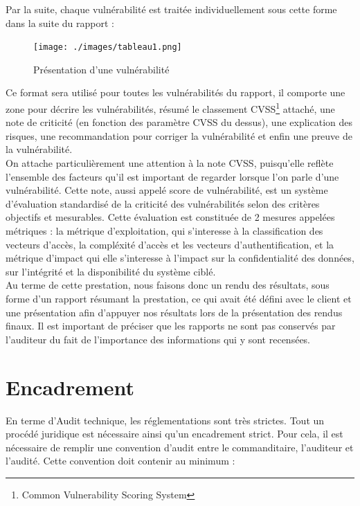 \documentclass[a4paper]{memoir}
\begin{document}
Par la suite, chaque vulnérabilité est traitée individuellement sous cette forme dans la suite du rapport : 

\begin{figure}[!ht]
\center
\texttt{[image: ./images/tableau1.png]}
\caption{Présentation d'une vulnérabilité}
\label{ID}
\end{figure}

Ce format sera utilisé pour toutes les vulnérabilités du rapport, il comporte une zone pour décrire les vulnérabilités, résumé le classement CVSS\footnote{Common Vulnerability Scoring System} attaché, une note de criticité (en fonction des paramètre CVSS du dessus), une explication des risques, une recommandation pour corriger la vulnérabilité et enfin une preuve de la vulnérabilité.\\

On attache particulièrement une attention à la note CVSS, puisqu'elle reflète l'ensemble des facteurs qu'il est important de regarder lorsque l'on parle d'une vulnérabilité.
Cette note, aussi appelé score de vulnérabilité, est un système d'évaluation standardisé de la criticité des vulnérabilités selon des critères objectifs et mesurables. Cette évaluation est constituée de 2 mesures appelées métriques : la métrique d'exploitation, qui s'interesse à la classification des vecteurs d'accès, la compléxité d'accès et les vecteurs d'authentification, et la métrique d'impact qui elle s'interesse à l'impact sur la confidentialité des données, sur l'intégrité et la disponibilité  du système ciblé.\\

Au terme de cette prestation, nous faisons donc un rendu des résultats, sous forme d'un rapport résumant la prestation, ce qui avait été défini avec le client et une présentation afin d'appuyer nos résultats lors de la présentation des rendus finaux.
Il est important de préciser que les rapports ne sont pas conservés par l'auditeur du fait de l'importance des informations qui y sont recensées.


\chapter{Encadrement}

En terme d'Audit technique, les réglementations sont très strictes. Tout un procédé juridique est nécessaire ainsi qu’un encadrement strict. Pour cela, il est nécessaire de remplir une convention d'audit entre le commanditaire, l'auditeur et l'audité. Cette convention doit contenir au minimum : \\
\end{document}
